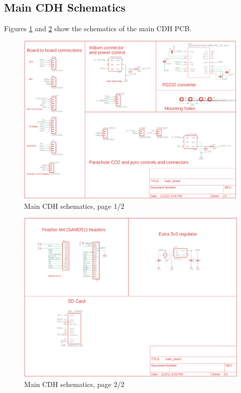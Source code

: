 \documentclass{article}
\begin{document}
\newpage
\subsection{Main CDH Schematics}
Figures \ref{fig:schematic-cdh-p1} and \ref{fig:schematic-cdh-p2} show the schematics of the main CDH PCB.
\begin{figure}[H]
	\centering
	\includegraphics[width=\textwidth]{images/main_board_schem_1}
	\caption{Main CDH schematics, page 1/2}
	\label{fig:schematic-cdh-p1}
\end{figure}
\begin{figure}[H]
	\centering
	\includegraphics[width=\textwidth]{images/main_board_schem_2}
	\caption{Main CDH schematics, page 2/2}
	\label{fig:schematic-cdh-p2}
\end{figure}
\end{document}

